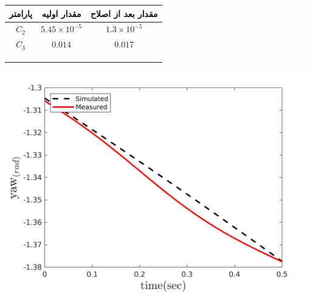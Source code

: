 \begin{minipage}[H]{\linewidth}
	\hfill
	\begin{minipage}[b]{0.49\linewidth}
		\centering
		\begin{tabular}{ccc}\hline
			پارامتر & مقدار اولیه  & مقدار بعد از اصلاح
			\\ \hline
			$C_2$  & $5.45\times10^{-5}$ & $1.3\times10^{-5}$ \\
			$C_3$  & $0.014$ & $0.017$ \\ \hline
			\\\\\\
		\end{tabular}
	\end{minipage}
	\begin{minipage}[b]{0.48\linewidth}
		\centering
		\includegraphics[width=1\linewidth]{../Figures/RCP/yaw_parameter_estimation/RCP_yaw_S2.png}
	\end{minipage}
\end{minipage}
